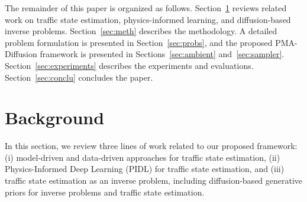 \documentclass[a4paper,fleqn]{cas-sc}
\numberwithin{equation}{section}
\begin{document}
The remainder of this paper is organized as follows. Section~\ref{sec:back} reviews related work on traffic state estimation, physics-informed learning, and diffusion-based inverse problems. Section~\ref{sec:meth} describes the methodology. A detailed problem formulation is presented in Section~\ref{sec:probs}, and the proposed PMA-Diffusion framework is presented in Sections~\ref{sec:ambient} and~\ref{sec:sampler}. Section~\ref{sec:experiments} describes the experiments and evaluations. Section~\ref{sec:conclu} concludes the paper.

\section{Background}\label{sec:back}


In this section, we review three lines of work related to our proposed framework: (i) model-driven and data-driven approaches for traffic state estimation, (ii) Physics-Informed Deep Learning (PIDL) for traffic state estimation, and (iii) traffic state estimation as an inverse problem, including diffusion-based generative priors for inverse problems and traffic state estimation.
\end{document}

